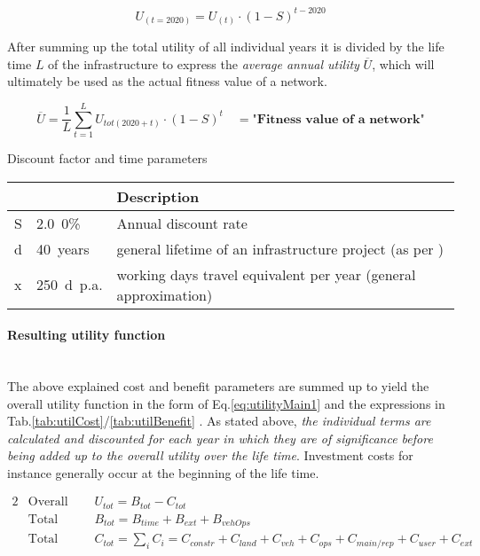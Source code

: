 \begin{equation}
	\label{eq:discount}
	U_{(t=2020)} = U_{(t)}\cdot \left(1-S\right)^{t-2020}
\end{equation}

After summing up the total utility of all individual years it is divided by the life time $L$ of the infrastructure to express the \textit{average annual utility} $\overline{U}$, which will ultimately be used as the actual fitness value of a network.

\begin{equation}
	\label{eq:averageAnnualUtility}
	\overline{U} = \frac{1}{L}\sum_{t=1}^{L} U_{tot(2020+t)}\cdot \left(1-S\right)^{t} \quad = \textbf{"Fitness value of a network"}
\end{equation}


%
{Discount factor and time parameters}%
{\label{tab:timeParameters}}%
{%
	\begin{tabular}{L | L | l}
		\toprule
		 &  & Description \\ \hline
		S & 2.0~0\% & Annual discount rate \citet{VSS_Norm_641820_2006Own} \\
		d & 40~years & general lifetime of an infrastructure project (as per \citet{VSS_Norm_641820_2006Own})\\
		x & 250~d~p.a. & working days travel equivalent per year (general approximation) \\
		\bottomrule
	\end{tabular}
}%
{}


\paragraph{Resulting utility function}\mbox{}\\
The above explained cost and benefit parameters are summed up to yield the overall utility function in the form of Eq.\ref{eq:utilityMain1} and the expressions in Tab.\ref{tab:utilCost}/\ref{tab:utilBenefit} . As stated above, \emph{the individual terms are calculated and discounted for each year in which they are of significance before being added up to the overall utility over the life time}. Investment costs for instance generally occur at the beginning of the life time.

\begin{alignat}{2}
&\text{Overall Utility:}  &&U_{tot} = B_{tot} - C_{tot}  \label{eq:utilityMain1} \\
&\text{Total Benefit:  }  &&B_{tot} = B_{time} + B_{ext} + B_{vehOps}  \label{eq:utilityMain2} \\
&\text{Total Cost:     }  &&C_{tot} = \sum_{i}C_i =  C_{constr} + C_{land} + C_{veh} + C_{ops} + C_{main/rep}  + C_{user} + C_{ext} \label{eq:utilityMain3}
\end{alignat}


